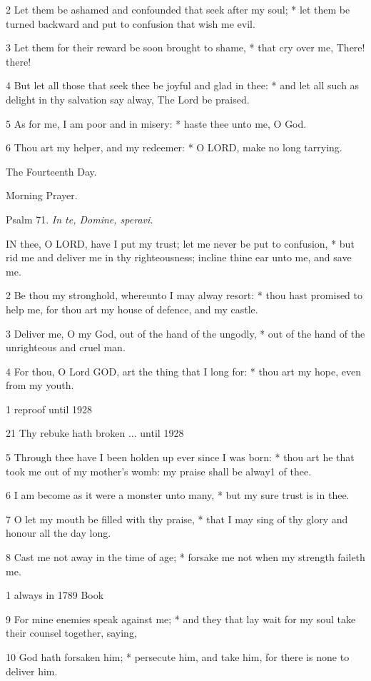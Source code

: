2 Let them be ashamed and confounded that seek after
my soul; * let them be turned backward and put to confusion that wish
me evil.

3 Let them for their reward be soon brought to shame,
* that cry over me, There! there!

4 But let all those that seek thee be joyful and glad
in thee: * and let all such as delight in thy salvation say alway, The
Lord be praised.

5 As for me, I am poor and in misery: * haste thee
unto me, O God.

6 Thou art my helper, and my redeemer: * O LORD, make
no long tarrying.

The
Fourteenth Day.

Morning
Prayer.

Psalm
71. \emph{In te, Domine, speravi.}

IN
thee, O LORD, have I put my trust; let me never be put to confusion, *
but rid me and deliver me in thy righteousness; incline thine ear unto
me, and save me.

2 Be thou my stronghold, whereunto I may alway resort:
* thou hast promised to help me, for thou art my house of defence, and
my castle.

3 Deliver me, O my God, out of the hand of the ungodly,
* out of the hand of the unrighteous and cruel man.

4 For thou, O Lord GOD, art the thing that I long for:
* thou art my hope, even from my youth.

1 reproof
until 1928

21 Thy rebuke hath broken ...
until 1928

5 Through thee have I been holden up ever since I was born: * thou art he
that took me out of my mother's womb: my praise shall be alway1
of thee.

6 I am become as it were a monster unto many, * but my
sure trust is in thee.

7 O let my mouth be filled with thy praise, * that I
may sing of thy glory and honour all the day long.

8 Cast me not away in the time of age; * forsake me not
when my strength faileth me.

1 always in
1789 Book

9 For mine enemies speak against me; * and they that lay wait for my soul
take their counsel together, saying,

10 God hath forsaken him; * persecute him, and take him,
for there is none to deliver him.

